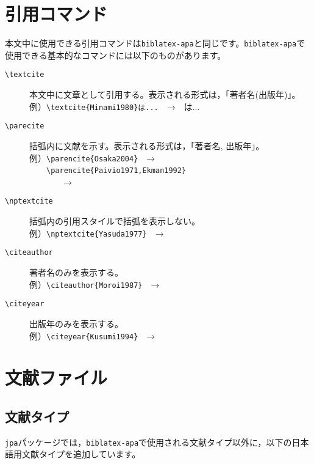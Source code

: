 \documentclass[12pt]{ltjsarticle}
\begin{document}
\section{引用コマンド}
本文中に使用できる引用コマンドは\texttt{biblatex-apa}と同じです。\texttt{biblatex-apa}で使用できる基本的なコマンドには以下のものがあります。

\begin{description}
  \item[\texttt{\textbackslash textcite}]
  本文中に文章として引用する。表示される形式は，「著者名(出版年)」。\\
  例）\texttt{\textbackslash textcite\{Minami1980\}は...}　→　\textcite{Minami1980}は...
  
  \item[\texttt{\textbackslash parecite}]
  括弧内に文献を示す。表示される形式は，「著者名, 出版年」。\\
  例）\texttt{\textbackslash parencite\{Osaka2004\}}　→　\parencite{Osaka2004}\\
  　　\texttt{\textbackslash parencite\{Paivio1971,Ekman1992\}}\\
  　　　　→　\parencite{Paivio1971,Ekman1992}

  \item[\texttt{\textbackslash nptextcite}]
  括弧内の引用スタイルで括弧を表示しない。\\
  例）\texttt{\textbackslash nptextcite\{Yasuda1977\}}　→　

  \item[\texttt{\textbackslash citeauthor}]
  著者名のみを表示する。\\
  例）\texttt{\textbackslash citeauthor\{Moroi1987\}}　→　\citeauthor{Moroi1987}

  \item[\texttt{\textbackslash citeyear}]
  出版年のみを表示する。\\
  例）\texttt{\textbackslash citeyear\{Kusumi1994\}}　→　\citeyear{Kusumi1994}
\end{description}


\section{文献ファイル}
\subsection{文献タイプ}
\texttt{jpa}パッケージでは，\texttt{biblatex-apa}で使用される文献タイプ以外に，以下の日本語用文献タイプを追加しています。
\end{document}

